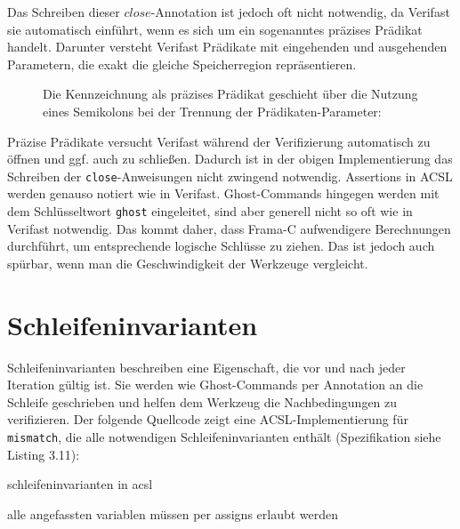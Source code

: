 Das Schreiben dieser \(close\)-Annotation ist jedoch oft nicht notwendig, da Verifast sie automatisch
einführt, wenn es sich um ein sogenanntes präzises Prädikat handelt. Darunter versteht Verifast Prädikate mit 
eingehenden und ausgehenden Parametern, die exakt die gleiche Speicherregion repräsentieren. 

\begin{figure}[H]
Die Kennzeichnung als präzises Prädikat geschieht über die Nutzung eines Semikolons bei der Trennung
der Prädikaten-Parameter:


\end{figure}
Präzise Prädikate versucht Verifast während der Verifizierung automatisch zu öffnen und ggf. auch zu
schließen. Dadurch ist in der obigen Implementierung das Schreiben der \texttt{close}-Anweisungen
nicht zwingend notwendig.
\newline
\newline
Assertions in ACSL werden genauso notiert wie in Verifast. Ghost-Commands hingegen werden
mit dem Schlüsseltwort \lstinline{ghost} eingeleitet, sind aber generell nicht so oft wie in
Verifast notwendig. Das kommt daher, dass Frama-C aufwendigere Berechnungen durchführt, um
entsprechende logische Schlüsse zu ziehen. Das ist jedoch auch spürbar, wenn man die
Geschwindigkeit der Werkzeuge vergleicht.


\section{Schleifeninvarianten}

Schleifeninvarianten beschreiben eine Eigenschaft, die vor und nach jeder Iteration gültig ist. Sie
werden wie Ghost-Commands per Annotation an die Schleife geschrieben und helfen dem Werkzeug die
Nachbedingungen zu verifizieren.
\newline
\newline
Der folgende Quellcode zeigt eine ACSL-Implementierung für \lstinline{mismatch}, die alle
notwendigen Schleifeninvarianten enthält (Spezifikation siehe Listing 3.11):
\begin{figure}[H]

\end{figure} 


schleifeninvarianten in acsl

alle angefassten variablen müssen per assigns erlaubt werden

